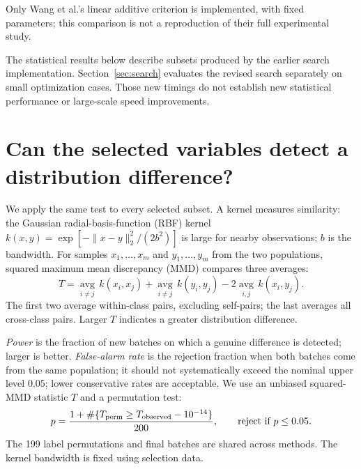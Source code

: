 \documentclass[11pt,a4paper]{article}
\begin{document}
Only Wang et al.'s linear additive criterion is implemented, with fixed
parameters; this comparison is not a reproduction of their full experimental study.

The statistical results below describe subsets produced by the earlier search
implementation. Section~\ref{sec:search} evaluates the revised search separately
on small optimization cases. Those new timings do not establish new statistical
performance or large-scale speed improvements.

\FloatBarrier
\section{Can the selected variables detect a distribution difference?}\label{sec:statistics}
We apply the same test to every selected subset. A kernel measures similarity:
the Gaussian radial-basis-function (RBF) kernel
$k(x,y)=\exp[-\|x-y\|_2^2/(2b^2)]$ is large for nearby observations;
$b$ is the bandwidth. For samples $x_1,\ldots,x_m$ and $y_1,\ldots,y_m$
from the two populations, squared maximum mean discrepancy (MMD) compares three averages:
\[
T=\underset{i\ne j}{\operatorname{avg}}\,k(x_i,x_j)
 +\underset{i\ne j}{\operatorname{avg}}\,k(y_i,y_j)
 -2\underset{i,j}{\operatorname{avg}}\,k(x_i,y_j).
\]
The first two average within-class pairs, excluding self-pairs; the last averages
all cross-class pairs. Larger $T$ indicates a greater distribution difference.

\emph{Power} is the fraction of new batches on which a genuine difference is
detected; larger is better. \emph{False-alarm rate} is the rejection fraction
when both batches come from the same population; it should not systematically exceed the
nominal upper level $0.05$; lower conservative rates are acceptable. We use an unbiased squared-MMD statistic $T$ and a
permutation test:
\begin{equation}\label{eq:permutation}
p=\frac{1+\#\{T_{\rm perm}\ge T_{\rm observed}-10^{-14}\}}{200},\qquad
\text{reject if }p\le0.05.
\end{equation}
The 199 label permutations and final batches are shared across methods.
The kernel bandwidth is fixed using selection data.

\FloatBarrier
\end{document}
